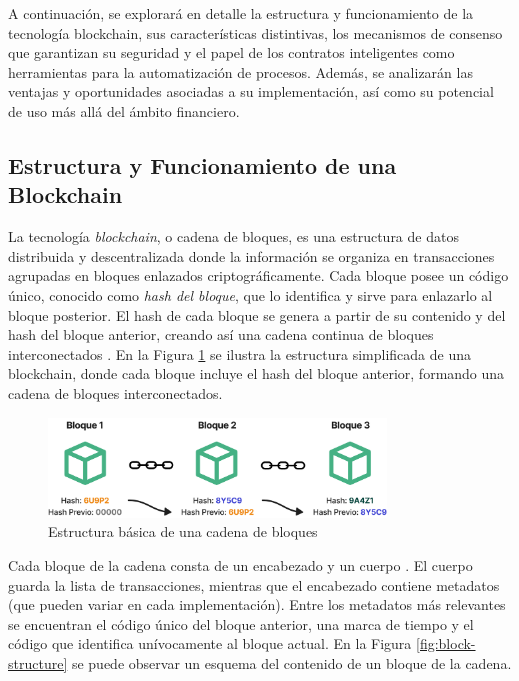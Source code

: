 A continuación, se explorará en detalle la estructura y funcionamiento de la tecnología blockchain, sus características distintivas, los mecanismos de consenso que garantizan su seguridad y el papel de los contratos inteligentes como herramientas para la automatización de procesos. Además, se analizarán las ventajas y oportunidades asociadas a su implementación, así como su potencial de uso más allá del ámbito financiero.

\subsection{Estructura y Funcionamiento de una Blockchain}

La tecnología \textit{blockchain}, o cadena de bloques, es una estructura de datos distribuida y descentralizada donde la información se organiza en transacciones agrupadas en bloques enlazados criptográficamente. Cada bloque posee un código único, conocido como \textit{hash del bloque}, que lo identifica y sirve para enlazarlo al bloque posterior. El hash de cada bloque se genera a partir de su contenido y del hash del bloque anterior, creando así una cadena continua de bloques interconectados \cite{tripathi2023comprehensive}. En la Figura \ref{fig:blockchain-basic} se ilustra la estructura simplificada de una blockchain, donde cada bloque incluye el hash del bloque anterior, formando una cadena de bloques interconectados.

\begin{figure}[!ht]
    \centering
    \includegraphics[width=0.8\textwidth]{Figures/blockchain-basic.png}
    \caption{Estructura básica de una cadena de bloques}
    \label{fig:blockchain-basic}
\end{figure}

Cada bloque de la cadena consta de un encabezado y un cuerpo \cite{tripathi2023comprehensive}. El cuerpo guarda la lista de transacciones, mientras que el encabezado contiene metadatos (que pueden variar en cada implementación). Entre los metadatos más relevantes se encuentran el código único del bloque anterior, una marca de tiempo y el código que identifica unívocamente al bloque actual. En la Figura \ref{fig:block-structure} se puede observar un esquema del contenido de un bloque de la cadena.

